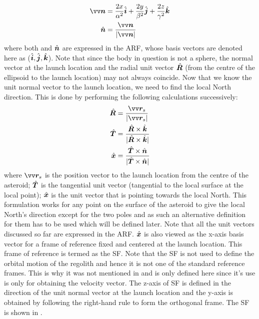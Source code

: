 \begin{align}
    \bv{n} &= \frac{2x}{\alpha^2}\buvec{i} + \frac{2y}{\beta^2}\buvec{j} + \frac{2z}{\gamma^2}\buvec{k}
    \label{eqn:surface_normal_vector} \\
    \buvec{n} &= \frac{\bv{n}}{|\bv{n}|}
    \label{eqn:unit_normal}
\end{align}
where both  and $\hat{\bm{n}}$ are expressed in the \gls{ARF}, whose basis vectors are denoted here as ($\hat{\bm{i}},\hat{\bm{j}},\hat{\bm{k}}$). Note that since the body in question is not a sphere, the normal vector at the launch location and the radial unit vector $\hat{\bm{R}}$ (from the centre of the ellipsoid to the launch location) may not always coincide. Now that we know the unit normal vector to the launch location, we need to find the local North direction. This is done by performing the following calculations successively:
\begin{align}
    \buv{R} &= \frac{\bv{r}_s}{|\bv{r}_s|} \\
    \buv{T} &= \frac{\buv{R} \times \buv{k}}{|\buv{R} \times \buv{k}|} \\
    \buv{x} &= \frac{\buv{T} \times \buv{n}}{|\buv{T} \times \buv{n}|} \\
    \label{eqn:surface_frame_xBasis}
\end{align}
where $\bv{r}_s$ is the position vector to the launch location from the centre of the asteroid; $\hat{\bm{T}}$ is the tangential unit vector (tangential to the local surface at the local point); $\hat{\bm{x}}$ is the unit vector that is pointing towards the local North. This formulation works for any point on the surface of the asteroid to give the local North's direction except for the two poles and as such an alternative definition for them has to be used which will be defined later. Note that all the unit vectors discussed so far are expressed in the \gls{ARF}.
%
\newline\newline
%
$\hat{\bm{x}}$ is also viewed as the x-axis basis vector for a frame of reference fixed and centered at the launch location. This frame of reference is termed as the \gls{SF}. Note that the \gls{SF} is not used to define the orbital motion of the regolith and hence it is not one of the standard reference frames. This is why it was not mentioned in  and is only defined here since it's use is only for obtaining the velocity vector. The z-axis of \gls{SF} is defined in the direction of the unit normal vector at the launch location and the y-axis is obtained by following the right-hand rule to form the orthogonal frame. The \gls{SF} is shown in .
